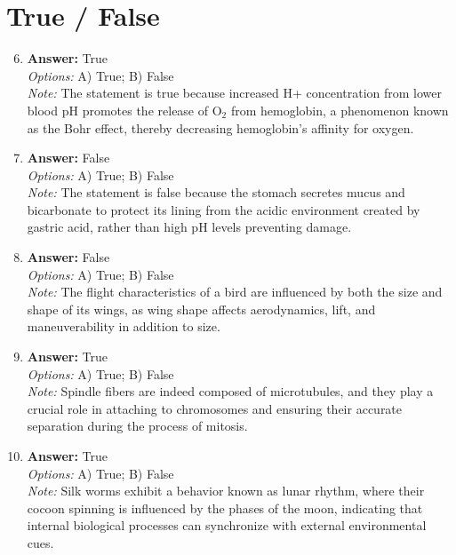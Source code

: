 \documentclass[12pt]{article}
\begin{document}
\section*{True / False}
\begin{enumerate}[label=\arabic*.]
\setcounter{enumi}{5}
\item \textbf{Answer:} True
\\ \textit{Options:} A) True; B) False
\\ \textit{Note:} The statement is true because increased H+ concentration from lower blood pH promotes the release of O$_{2}$ from hemoglobin, a phenomenon known as the Bohr effect, thereby decreasing hemoglobin's affinity for oxygen.
\item \textbf{Answer:} False
\\ \textit{Options:} A) True; B) False
\\ \textit{Note:} The statement is false because the stomach secretes mucus and bicarbonate to protect its lining from the acidic environment created by gastric acid, rather than high pH levels preventing damage.
\item \textbf{Answer:} False
\\ \textit{Options:} A) True; B) False
\\ \textit{Note:} The flight characteristics of a bird are influenced by both the size and shape of its wings, as wing shape affects aerodynamics, lift, and maneuverability in addition to size.
\item \textbf{Answer:} True
\\ \textit{Options:} A) True; B) False
\\ \textit{Note:} Spindle fibers are indeed composed of microtubules, and they play a crucial role in attaching to chromosomes and ensuring their accurate separation during the process of mitosis.
\item \textbf{Answer:} True
\\ \textit{Options:} A) True; B) False
\\ \textit{Note:} Silk worms exhibit a behavior known as lunar rhythm, where their cocoon spinning is influenced by the phases of the moon, indicating that internal biological processes can synchronize with external environmental cues.
\end{enumerate}
\end{document}
